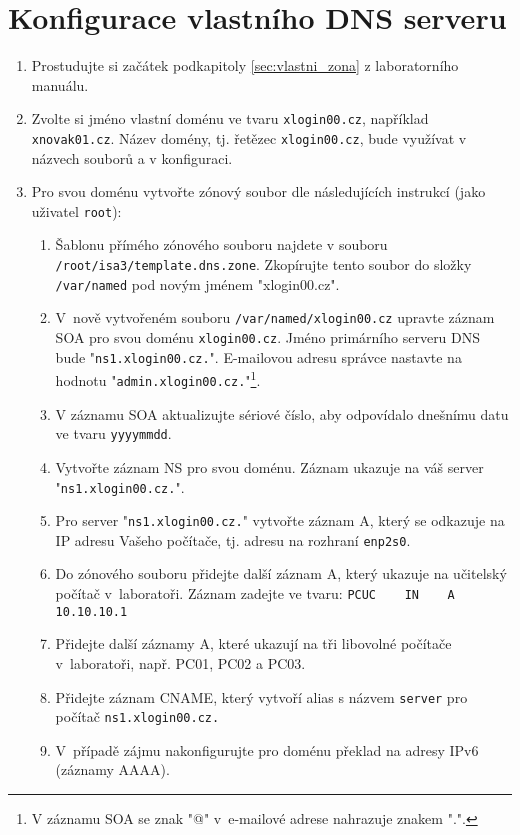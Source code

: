 \documentclass[a4paper,11pt]{article}
\begin{document}
\section{Konfigurace vlastního DNS serveru}
\begin{enumerate}
  \item Prostudujte si začátek podkapitoly \ref{sec:vlastni_zona} z laboratorního manuálu.
  \item Zvolte si jméno vlastní doménu ve tvaru {\tt xlogin00.cz}, například {\tt xnovak01.cz}. Název domény, tj. řetězec {\tt xlogin00.cz}, bude využívat v názvech souborů a v konfiguraci.

\item Pro svou doménu vytvořte zónový soubor dle následujících instrukcí (jako uživatel {\tt root}):
    \begin{enumerate}
      \item Šablonu přímého zónového souboru najdete v souboru {\tt /root/isa3/template.dns.zone}. Zkopírujte tento soubor do složky {\tt /var/named} pod novým jménem "xlogin00.cz".
      \item V~nově vytvořeném souboru {\tt /var/named/xlogin00.cz} upravte záznam SOA pro svou doménu {\tt xlogin00.cz}. Jméno primárního serveru DNS bude "{\tt ns1.xlogin00.cz.}". \rm E-mailovou adresu správce nastavte na hodnotu "{\tt admin.xlogin00.cz.}"\rm \footnote{V záznamu SOA se znak "@" v~e-mailové adrese nahrazuje znakem ".".}.
      \item V záznamu SOA aktualizujte sériové číslo, aby odpovídalo dnešnímu datu ve tvaru {\tt yyyymmdd}.
      \item Vytvořte záznam NS pro svou doménu. Záznam ukazuje na váš server "{\tt ns1.xlogin00.cz.}"\rm.
      \item Pro server "{\tt ns1.xlogin00.cz.}"\rm \; vytvořte záznam A, který se odkazuje na IP adresu Vašeho počítače, tj. adresu na rozhraní {\tt enp2s0}. 
      \item Do zónového souboru přidejte další záznam A, který ukazuje na učitelský počítač v~laboratoři. Záznam zadejte ve tvaru: \verb|PCUC    IN    A    10.10.10.1|
      \item Přidejte další záznamy A, které ukazují na tři libovolné počítače v~laboratoři, např. PC01, PC02 a PC03.
      \item Přidejte záznam CNAME, který vytvoří alias s názvem {\tt server} pro počítač {\tt ns1.xlogin00.cz.}
      \item V~případě zájmu nakonfigurujte pro doménu překlad na adresy IPv6 (záznamy AAAA).
    \end{enumerate}
  

\end{enumerate}
\end{document}
